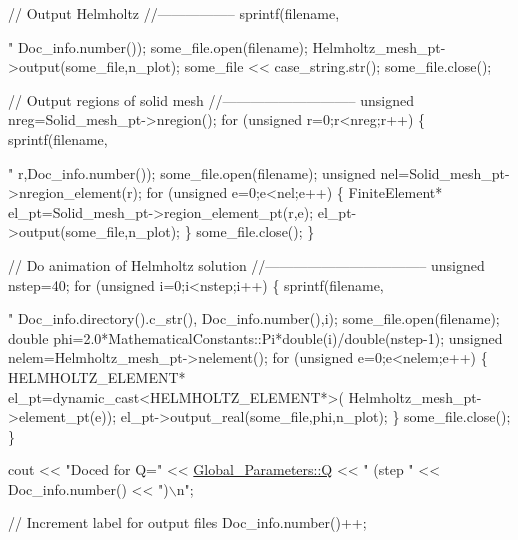 \begin{DoxyCodeInclude}
{{{{{{ \textcolor{comment}{// Output Helmholtz}
 \textcolor{comment}{//-----------------}
 sprintf(filename,\textcolor{stringliteral}{"%
         Doc\_info.number());
 some\_file.open(filename);
 Helmholtz\_mesh\_pt->output(some\_file,n\_plot);
 some\_file << case\_string.str();
 some\_file.close();
 
 \textcolor{comment}{// Output regions of solid mesh}
 \textcolor{comment}{//-----------------------------}
 \textcolor{keywordtype}{unsigned} nreg=Solid\_mesh\_pt->nregion();
 \textcolor{keywordflow}{for} (\textcolor{keywordtype}{unsigned} r=0;r<nreg;r++)
  \{
   sprintf(filename,\textcolor{stringliteral}{"%
           r,Doc\_info.number());   
   some\_file.open(filename);   
   \textcolor{keywordtype}{unsigned} nel=Solid\_mesh\_pt->nregion\_element(r);
   \textcolor{keywordflow}{for} (\textcolor{keywordtype}{unsigned} e=0;e<nel;e++)
    \{     
     FiniteElement* el\_pt=Solid\_mesh\_pt->region\_element\_pt(r,e);
     el\_pt->output(some\_file,n\_plot);
    \}
   some\_file.close();
  \}
 
 
 \textcolor{comment}{// Do animation of Helmholtz solution}
 \textcolor{comment}{//-----------------------------------}
 \textcolor{keywordtype}{unsigned} nstep=40;
 \textcolor{keywordflow}{for} (\textcolor{keywordtype}{unsigned} i=0;i<nstep;i++)
  \{
   sprintf(filename,\textcolor{stringliteral}{"%
           Doc\_info.directory().c\_str(),
           Doc\_info.number(),i);
   some\_file.open(filename);
   \textcolor{keywordtype}{double} phi=2.0*MathematicalConstants::Pi*double(i)/double(nstep-1);
   \textcolor{keywordtype}{unsigned} nelem=Helmholtz\_mesh\_pt->nelement();
   \textcolor{keywordflow}{for} (\textcolor{keywordtype}{unsigned} e=0;e<nelem;e++)
    \{
     HELMHOLTZ\_ELEMENT* el\_pt=\textcolor{keyword}{dynamic\_cast<}HELMHOLTZ\_ELEMENT*\textcolor{keyword}{>}(
      Helmholtz\_mesh\_pt->element\_pt(e));
     el\_pt->output\_real(some\_file,phi,n\_plot);    
    \}
   some\_file.close();
  \}

 cout << \textcolor{stringliteral}{"Doced for Q="} << \hyperlink{namespaceGlobal__Parameters_a7814fddf663e56168174a42d2cd6b4c1}{Global\_Parameters::Q} << \textcolor{stringliteral}{" (step "}
      << Doc\_info.number() << \textcolor{stringliteral}{")\(\backslash\)n"};
 
\textcolor{comment}{// Increment label for output files}
 Doc\_info.number()++;
 
}}}}}}}}}
\end{DoxyCodeInclude}

